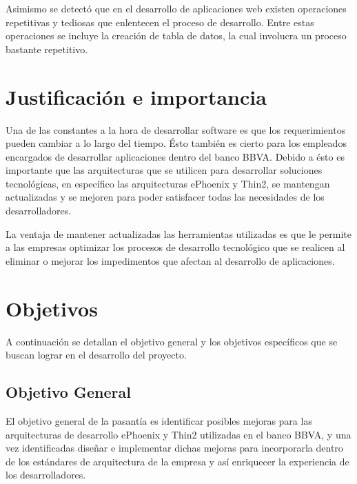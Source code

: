 Asimismo se detectó que en el desarrollo de aplicaciones web existen operaciones
repetitivas y tediosas que enlentecen el proceso de desarrollo. Entre estas
operaciones se incluye la creación de tabla de datos, la cual involucra
un proceso bastante repetitivo.

\section*{Justificación e importancia}
Una de las constantes a la hora de desarrollar software es que los
requerimientos pueden cambiar a lo largo del tiempo. Ésto también
es cierto para los empleados encargados de desarrollar aplicaciones
dentro del banco BBVA. Debido a ésto es importante que las arquitecturas
que se utilicen para desarrollar soluciones tecnológicas, en específico
las arquitecturas ePhoenix y Thin2, se mantengan actualizadas y se mejoren
para poder satisfacer todas las necesidades de los desarrolladores.

La ventaja de mantener actualizadas las herramientas utilizadas es que le permite
a las empresas optimizar los procesos de desarrollo tecnológico que se realicen al
eliminar o mejorar los impedimentos que afectan al desarrollo de aplicaciones.

\section*{Objetivos}
A continuación se detallan el objetivo general y los objetivos específicos que
se buscan lograr en el desarrollo del proyecto.
\subsection*{Objetivo General}
El objetivo general de la pasantía es identificar posibles mejoras para las arquitecturas
de desarrollo ePhoenix y Thin2 utilizadas en el banco BBVA, y una vez
identificadas diseñar e implementar dichas mejoras para incorporarla dentro de los
estándares de arquitectura de la empresa y así enriquecer la experiencia de los
desarrolladores.
